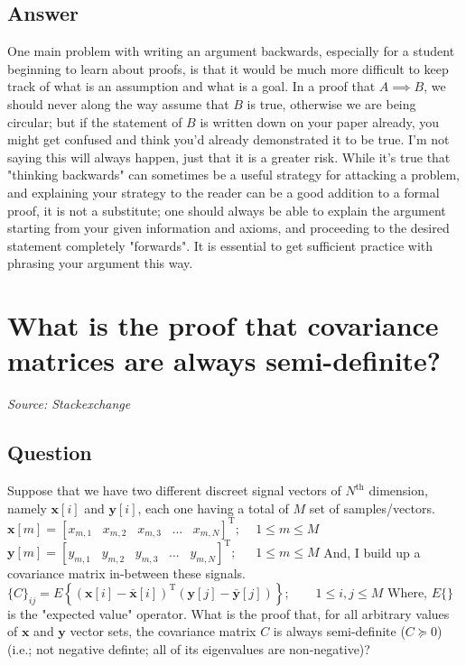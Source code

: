 \documentclass{article}
\begin{document}
\subsection*{Answer}
One main problem with writing an argument backwards, especially for a student beginning to learn about proofs, is that it would be much more difficult to keep track of what is an assumption and what is a goal. In a proof that $A\implies B$, we should never along the way assume that $B$ is true, otherwise we are being circular; but if the statement of $B$ is written down on your paper already, you might get confused and think you'd already demonstrated it to be true. I'm not saying this will always happen, just that it is a greater risk. While it's true that "thinking backwards" can sometimes be a useful strategy for attacking a problem, and explaining your strategy to the reader can be a good addition to a formal proof, it is not a substitute; one should always be able to explain the argument starting from your given information and axioms, and proceeding to the desired statement completely "forwards". It is essential to get sufficient practice with phrasing your argument this way.

\newpage

\section{What is the proof that covariance matrices are always semi-definite?}
\textit{Source: Stackexchange}

\subsection*{Question}
Suppose that we have two different discreet signal vectors of $N^\text{th}$ dimension, namely $\mathbf{x}[i]$ and $\mathbf{y}[i]$, each one having a total of $M$ set of samples/vectors. $\mathbf{x}[m] = [x_{m,1} \,\,\,\,\, x_{m,2} \,\,\,\,\, x_{m,3} \,\,\,\,\, ... \,\,\,\,\, x_{m,N}]^\text{T}; \,\,\,\,\,\,\, 1 \leq m \leq M$ $\mathbf{y}[m] = [y_{m,1} \,\,\,\,\, y_{m,2} \,\,\,\,\, y_{m,3} \,\,\,\,\, ... \,\,\,\,\, y_{m,N}]^\text{T}; \,\,\,\,\,\,\,\,\, 1 \leq m \leq M$ And, I build up a covariance matrix in-between these signals. $\{C\}_{ij} = E\left\{(\mathbf{x}[i] - \bar{\mathbf{x}}[i])^\text{T}(\mathbf{y}[j] - \bar{\mathbf{y}}[j])\right\}; \,\,\,\,\,\,\,\,\,\,\,\, 1 \leq i,j \leq M $ Where, $E\{\}$ is the "expected value" operator. What is the proof that, for all arbitrary values of $\mathbf{x}$ and $\mathbf{y}$ vector sets, the covariance matrix $C$ is always semi-definite ($C \succeq0$) (i.e.; not negative definte; all of its eigenvalues are non-negative)?
\end{document}
